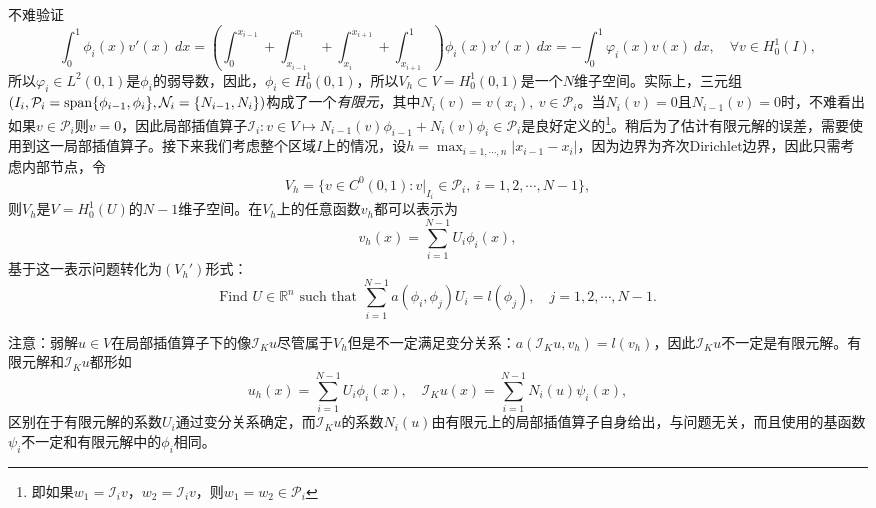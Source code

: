 \documentclass[a4paper,10pt]{ctexart}
\begin{document}
不难验证
\[
    \int_0^1 \phi_i(x) v'(x)\ dx = \left( \int_0^{x_{i-1}} + \int_{x_{i-1}}^{x_i} + \int_{x_i}^{x_{i+1}}+\int_{x_{i+1}}^1 \right)  \phi_i(x) v'(x)\ dx = - \int_0^1 \varphi_i(x) v(x)\ dx,\quad \forall v\in H^1_0(I),
\]
所以$ \varphi_i\in L^2(0,1) $是$ \phi_i $的弱导数，因此，$ \phi_i\in H^1_0(0,1) $，所以$ V_h\subset V=H^1_0(0,1) $是一个$ N $维子空间。实际上，三元组$ (I_i,\mathcal{P}_i={\rm span}\{\phi_{i-1},\phi_i\},\mathcal{N}_i=\{N_{i-1},N_i\}) $构成了一个\emph{有限元}，其中$ N_i(v) = v(x_i),\ v\in \mathcal{P}_i $。当$ N_i(v) = 0 $且$ N_{i-1}(v) = 0 $时，不难看出如果$ v\in \mathcal{P}_i $则$ v=0 $，因此局部插值算子$ \mathcal{I}_i:v\in V\mapsto N_{i-1}(v)\phi_{i-1}+N_i(v)\phi_i\in \mathcal{P}_i $是良好定义的\footnote{即如果$ w_1=\mathcal{I}_i v $，$ w_2 = \mathcal{I}_i v $，则$ w_1=w_2\in \mathcal{P}_i $}。稍后为了估计有限元解的误差，需要使用到这一局部插值算子。接下来我们考虑整个区域$ I $上的情况，设$ h = \max_{i=1,\cdots ,n}|x_{i-1}-x_i| $，因为边界为齐次Dirichlet边界，因此只需考虑内部节点，令
\[
    V_h = \{v\in C^0(0,1): v|_{I_i}\in \mathcal{P}_i,\ i=1,2,\cdots ,N-1\},
\]
则$ V_h $是$ V=H^1_0(U) $的$ N-1 $维子空间。在$ V_h $上的任意函数$ v_h $都可以表示为
\begin{equation}
    v_h(x) = \sum_{i=1}^{N-1} U_i\phi_i(x),
\end{equation}
基于这一表示问题转化为$ (V_h') $形式：
\begin{equation}
    \text{Find } U\in \mathbb{R}^n \text{ such that } \sum_{i=1}^{N-1}a(\phi_i,\phi_j)U_i = l(\phi_j),\quad j=1,2,\cdots ,N-1.
\end{equation}

注意：弱解$ u\in V $在局部插值算子下的像$ \mathcal{I}_K u $尽管属于$ V_h $但是不一定满足变分关系：$ a(\mathcal{I}_K u, v_h) = l(v_h) $，因此$ \mathcal{I}_K u $不一定是有限元解。有限元解和$ \mathcal{I}_K u $都形如
\begin{equation}
    u_h(x) = \sum_{i=1}^{N-1} U_i\phi_i(x),\quad \mathcal{I}_K u(x) = \sum_{i=1}^{N-1} N_{i}(u)\psi_{i}(x),
\end{equation}
区别在于有限元解的系数$ U_i $通过变分关系确定，而$ \mathcal{I}_K u $的系数$ N_i(u) $由有限元上的局部插值算子自身给出，与问题无关，而且使用的基函数$ \psi_i $不一定和有限元解中的$ \phi_i $相同。
\end{document}
